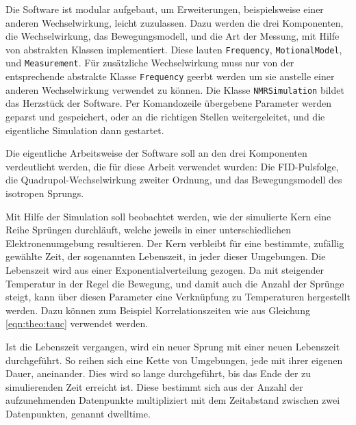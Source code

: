 Die Software ist modular aufgebaut, um Erweiterungen, beispielsweise einer anderen Wechselwirkung, leicht zuzulassen. Dazu werden die drei Komponenten, die Wechselwirkung, das Bewegungsmodell, und die Art der Messung, mit Hilfe von abstrakten Klassen implementiert. Diese lauten \texttt{Frequency}, \texttt{MotionalModel}, und \texttt{Measurement}. Für zusätzliche Wechselwirkung muss nur von der entsprechende abstrakte Klasse \texttt{Frequency} geerbt werden um sie anstelle einer anderen Wechselwirkung verwendet zu können. Die Klasse \texttt{NMRSimulation} bildet das Herzstück der Software. Per Komandozeile übergebene Parameter werden geparst und gespeichert, oder an die richtigen Stellen weitergeleitet, und die eigentliche Simulation dann gestartet.

Die eigentliche Arbeitsweise der Software soll an den drei Komponenten verdeutlicht werden, die für diese Arbeit verwendet wurden: Die FID-Pulsfolge, die Quadrupol-Wechselwirkung zweiter Ordnung, und das Bewegungsmodell des isotropen Sprungs.

Mit Hilfe der Simulation soll beobachtet werden, wie der simulierte Kern eine Reihe Sprüngen durchläuft, welche jeweils in einer unterschiedlichen Elektronenumgebung resultieren. Der Kern verbleibt für eine bestimmte, zufällig gewählte Zeit, der sogenannten Lebenszeit, in jeder dieser Umgebungen. Die Lebenszeit wird aus einer Exponentialverteilung gezogen. Da mit steigender Temperatur in der Regel die Bewegung, und damit auch die Anzahl der Sprünge steigt, kann über diesen Parameter eine Verknüpfung zu Temperaturen hergestellt werden. Dazu können zum Beispiel Korrelationszeiten wie aus Gleichung \eqref{eqn:theo:tauc} verwendet werden.

Ist die Lebenszeit vergangen, wird ein neuer Sprung mit einer neuen Lebenszeit durchgeführt. So reihen sich eine Kette von Umgebungen, jede mit ihrer eigenen Dauer, aneinander. Dies wird so lange durchgeführt, bis das Ende der zu simulierenden Zeit erreicht ist. Diese bestimmt sich aus der Anzahl der aufzunehmenden Datenpunkte multipliziert mit dem Zeitabstand zwischen zwei Datenpunkten, genannt dwelltime.

